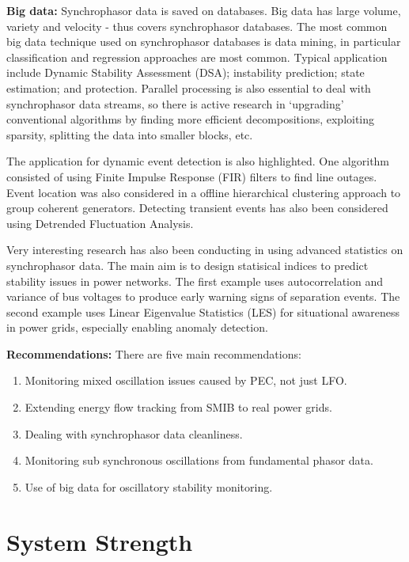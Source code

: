 \documentclass[12pt, a4paper]{report}
\begin{document}
\textbf{Big data:} Synchrophasor data is saved on databases. Big data has large volume, variety and velocity - thus covers synchrophasor databases. The most common big data technique used on synchrophasor databases is data mining, in particular classification and regression approaches are most common. Typical application include Dynamic Stability Assessment (DSA); instability prediction; state estimation; and protection. Parallel processing is also essential to deal with synchrophasor data streams, so there is active research in `upgrading' conventional algorithms by finding more efficient decompositions, exploiting sparsity, splitting the data into smaller blocks, etc.\par
The application for dynamic event detection is also highlighted. One algorithm consisted of using Finite Impulse Response (FIR) filters to find line outages. Event location was also considered in a offline hierarchical clustering approach to group coherent generators. Detecting transient events has also been considered using Detrended Fluctuation Analysis.\par
Very interesting research has also been conducting in using advanced statistics on synchrophasor data. The main aim is to design statisical indices to predict stability issues in power networks. The first example uses autocorrelation and variance of bus voltages to produce early warning signs of separation events. The second example uses Linear Eigenvalue Statistics (LES) for situational awareness in power grids, especially enabling anomaly detection.\par
\textbf{Recommendations:} There are five main recommendations:
\begin{enumerate}
	\item Monitoring mixed oscillation issues caused by PEC, not just LFO.
	\item Extending energy flow tracking from SMIB to real power grids.
	\item Dealing with synchrophasor data cleanliness.
	\item Monitoring sub synchronous oscillations from fundamental phasor data.
	\item Use of big data for oscillatory stability monitoring.
\end{enumerate} 
 


\chapter{System Strength}
\end{document}
